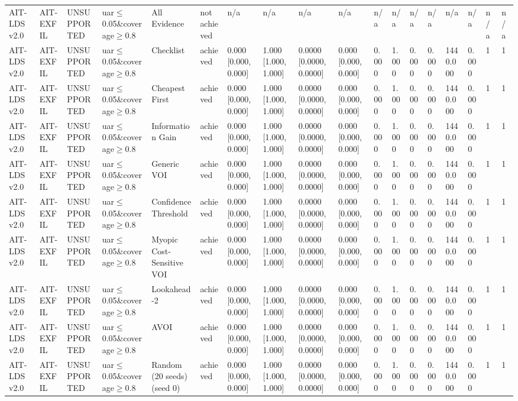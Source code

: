 \begin{table}[!ht]
{\begin{tabular}{llllllllllllllllll}
AIT-LDS v2.0 & AIT-EXFIL & UNSUPPORTED & uar$\le$0.05\&coverage$\ge$0.8 & All Evidence & not achieved & n/a & n/a & n/a & n/a & n/a & n/a & n/a & n/a & n/a & n/a & n/a & n/a \\
AIT-LDS v2.0 & AIT-EXFIL & UNSUPPORTED & uar$\le$0.05\&coverage$\ge$0.8 & Checklist & achieved & 0.000 [0.000, 0.000] & 1.000 [1.000, 1.000] & 0.0000 [0.0000, 0.0000] & 0.000 [0.000, 0.000] & 0.000 & 1.000 & 0.000 & 0.000 & 1440.000 & 0.000 & 1 & 1 \\
AIT-LDS v2.0 & AIT-EXFIL & UNSUPPORTED & uar$\le$0.05\&coverage$\ge$0.8 & Cheapest First & achieved & 0.000 [0.000, 0.000] & 1.000 [1.000, 1.000] & 0.0000 [0.0000, 0.0000] & 0.000 [0.000, 0.000] & 0.000 & 1.000 & 0.000 & 0.000 & 1440.000 & 0.000 & 1 & 1 \\
AIT-LDS v2.0 & AIT-EXFIL & UNSUPPORTED & uar$\le$0.05\&coverage$\ge$0.8 & Information Gain & achieved & 0.000 [0.000, 0.000] & 1.000 [1.000, 1.000] & 0.0000 [0.0000, 0.0000] & 0.000 [0.000, 0.000] & 0.000 & 1.000 & 0.000 & 0.000 & 1440.000 & 0.000 & 1 & 1 \\
AIT-LDS v2.0 & AIT-EXFIL & UNSUPPORTED & uar$\le$0.05\&coverage$\ge$0.8 & Generic VOI & achieved & 0.000 [0.000, 0.000] & 1.000 [1.000, 1.000] & 0.0000 [0.0000, 0.0000] & 0.000 [0.000, 0.000] & 0.000 & 1.000 & 0.000 & 0.000 & 1440.000 & 0.000 & 1 & 1 \\
AIT-LDS v2.0 & AIT-EXFIL & UNSUPPORTED & uar$\le$0.05\&coverage$\ge$0.8 & Confidence Threshold & achieved & 0.000 [0.000, 0.000] & 1.000 [1.000, 1.000] & 0.0000 [0.0000, 0.0000] & 0.000 [0.000, 0.000] & 0.000 & 1.000 & 0.000 & 0.000 & 1440.000 & 0.000 & 1 & 1 \\
AIT-LDS v2.0 & AIT-EXFIL & UNSUPPORTED & uar$\le$0.05\&coverage$\ge$0.8 & Myopic Cost-Sensitive VOI & achieved & 0.000 [0.000, 0.000] & 1.000 [1.000, 1.000] & 0.0000 [0.0000, 0.0000] & 0.000 [0.000, 0.000] & 0.000 & 1.000 & 0.000 & 0.000 & 1440.000 & 0.000 & 1 & 1 \\
AIT-LDS v2.0 & AIT-EXFIL & UNSUPPORTED & uar$\le$0.05\&coverage$\ge$0.8 & Lookahead-2 & achieved & 0.000 [0.000, 0.000] & 1.000 [1.000, 1.000] & 0.0000 [0.0000, 0.0000] & 0.000 [0.000, 0.000] & 0.000 & 1.000 & 0.000 & 0.000 & 1440.000 & 0.000 & 1 & 1 \\
AIT-LDS v2.0 & AIT-EXFIL & UNSUPPORTED & uar$\le$0.05\&coverage$\ge$0.8 & AVOI & achieved & 0.000 [0.000, 0.000] & 1.000 [1.000, 1.000] & 0.0000 [0.0000, 0.0000] & 0.000 [0.000, 0.000] & 0.000 & 1.000 & 0.000 & 0.000 & 1440.000 & 0.000 & 1 & 1 \\
AIT-LDS v2.0 & AIT-EXFIL & UNSUPPORTED & uar$\le$0.05\&coverage$\ge$0.8 & Random (20 seeds) (seed 0) & achieved & 0.000 [0.000, 0.000] & 1.000 [1.000, 1.000] & 0.0000 [0.0000, 0.0000] & 0.000 [0.000, 0.000] & 0.000 & 1.000 & 0.000 & 0.000 & 1440.000 & 0.000 & 1 & 1 \\

\end{tabular}}
\end{table}
